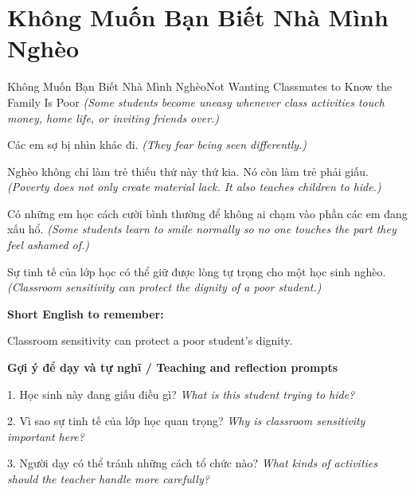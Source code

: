 \section{Không Muốn Bạn Biết Nhà Mình Nghèo}
\begin{truyen}{Không Muốn Bạn Biết Nhà Mình Nghèo}{Not Wanting Classmates to Know the Family Is Poor}
\textit{(Some students become uneasy whenever class activities touch money, home life, or inviting friends over.)}

Các em sợ bị nhìn khác đi.
\textit{(They fear being seen differently.)}

Nghèo không chỉ làm trẻ thiếu thứ này thứ kia. Nó còn làm trẻ phải giấu.
\textit{(Poverty does not only create material lack. It also teaches children to hide.)}

Có những em học cách cười bình thường để không ai chạm vào phần các em đang xấu hổ.
\textit{(Some students learn to smile normally so no one touches the part they feel ashamed of.)}

\end{truyen}

\begin{baihoc}
Sự tinh tế của lớp học có thể giữ được lòng tự trọng cho một học sinh nghèo.
\textit{(Classroom sensitivity can protect the dignity of a poor student.)}
\end{baihoc}

\begin{ghinhoanh}
\textbf{Short English to remember:}

Classroom sensitivity can protect a poor student’s dignity.

\end{ghinhoanh}

\begin{tuhocnhanh}
\textbf{Gợi ý để dạy và tự nghĩ / Teaching and reflection prompts}

1. Học sinh này đang giấu điều gì? \textit{What is this student trying to hide?}

2. Vì sao sự tinh tế của lớp học quan trọng? \textit{Why is classroom sensitivity important here?}

3. Người dạy có thể tránh những cách tổ chức nào? \textit{What kinds of activities should the teacher handle more carefully?}
\end{tuhocnhanh}
\ngancach

